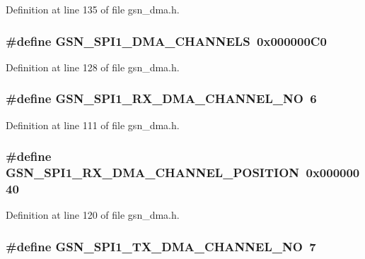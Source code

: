 Definition at line 135 of file gsn\_\-dma.h.

\hypertarget{a00484_a145e8d83b4aab58ed8c87c5fba134412}{
\subsubsection[{GSN\_\-SPI1\_\-DMA\_\-CHANNELS}]{\setlength{\rightskip}{0pt plus 5cm}\#define GSN\_\-SPI1\_\-DMA\_\-CHANNELS~0x000000C0}}
\label{a00484_a145e8d83b4aab58ed8c87c5fba134412}


Definition at line 128 of file gsn\_\-dma.h.

\hypertarget{a00484_a549ef3642c7fda450410e62b56c3de9e}{
\subsubsection[{GSN\_\-SPI1\_\-RX\_\-DMA\_\-CHANNEL\_\-NO}]{\setlength{\rightskip}{0pt plus 5cm}\#define GSN\_\-SPI1\_\-RX\_\-DMA\_\-CHANNEL\_\-NO~6}}
\label{a00484_a549ef3642c7fda450410e62b56c3de9e}


Definition at line 111 of file gsn\_\-dma.h.

\hypertarget{a00484_ab332814b750e9d06dabe0aa4d0ab3845}{
\subsubsection[{GSN\_\-SPI1\_\-RX\_\-DMA\_\-CHANNEL\_\-POSITION}]{\setlength{\rightskip}{0pt plus 5cm}\#define GSN\_\-SPI1\_\-RX\_\-DMA\_\-CHANNEL\_\-POSITION~0x00000040}}
\label{a00484_ab332814b750e9d06dabe0aa4d0ab3845}


Definition at line 120 of file gsn\_\-dma.h.

\hypertarget{a00484_ab131954c327881d5fe08be1dd5510f3d}{
\subsubsection[{GSN\_\-SPI1\_\-TX\_\-DMA\_\-CHANNEL\_\-NO}]{\setlength{\rightskip}{0pt plus 5cm}\#define GSN\_\-SPI1\_\-TX\_\-DMA\_\-CHANNEL\_\-NO~7}}
\label{a00484_ab131954c327881d5fe08be1dd5510f3d}


